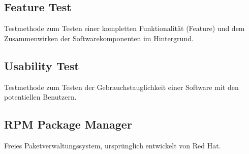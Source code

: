 \subsection*{Feature Test}
Testmethode zum Testen einer kompletten Funktionalität (Feature) und dem Zusammenwirken der
Softwarekomponenten im Hintergrund.
\subsection*{Usability Test}
Testmethode zum Testen der Gebrauchstauglichkeit einer Software mit den potentiellen Benutzern.
\subsection*{RPM Package Manager}
Freies Paketverwaltungssystem, ursprünglich entwickelt von Red Hat.

